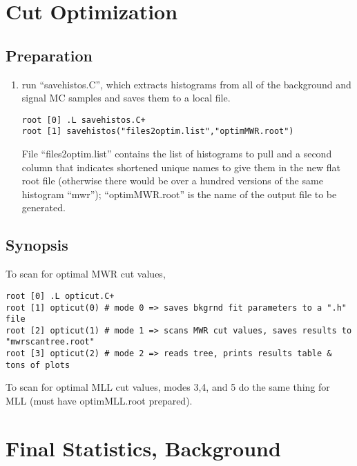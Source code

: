 \documentclass[english]{article}
\begin{document}
\section{Cut Optimization}

\subsection{Preparation}
%
\begin{enumerate}
\item run ``savehistos.C'', which extracts histograms from all of the
background and signal MC samples and saves them to a local file.
%
\begin{lstlisting}
root [0] .L savehistos.C+
root [1] savehistos("files2optim.list","optimMWR.root")
\end{lstlisting}
%
File ``files2optim.list'' contains the list of histograms to pull
and a second column that indicates shortened unique names to give them
in the new flat root file (otherwise there would be over a hundred
versions of the same histogram ``mwr''); ``optimMWR.root'' is the
name of the output file to be generated.
%
\end{enumerate}

\subsection{Synopsis}
%
To scan for optimal MWR cut values,
\begin{lstlisting}
root [0] .L opticut.C+
root [1] opticut(0) # mode 0 => saves bkgrnd fit parameters to a ".h" file
root [2] opticut(1) # mode 1 => scans MWR cut values, saves results to "mwrscantree.root"
root [3] opticut(2) # mode 2 => reads tree, prints results table & tons of plots
\end{lstlisting}
%
To scan for optimal MLL cut values, modes 3,4, and 5 do the same thing
for MLL (must have optimMLL.root prepared).

\section{Final Statistics, Background}
\end{document}
